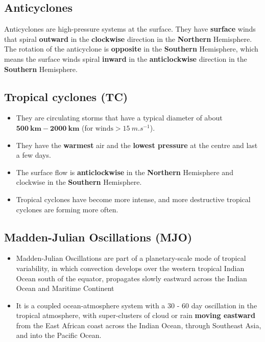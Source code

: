\documentclass[11pt]{article}
\begin{document}
\subsection{Anticyclones}
\label{sec:org1906adb}
Anticyclones are high-pressure systems at the surface. They have \textbf{surface} winds that spiral \textbf{outward} in the \textbf{clockwise} direction in the \textbf{Northern} Hemisphere. The rotation of the anticyclone is \textbf{opposite} in the \textbf{Southern} Hemisphere, which means the surface winds spiral \textbf{inward} in the \textbf{anticlockwise} direction in the \textbf{Southern} Hemisphere.

\subsection{Tropical cyclones (TC)}
\label{sec:orga4bb858}
\begin{itemize}
\item They are circulating storms that have a typical diameter of about \(\mathbf{\qty{500}{km} - \qty{2000}{km}}\) (for \(\text{winds} > \qty{15}{m.s^{-1}}\)).
\item They have the \textbf{warmest} air and the \textbf{lowest pressure} at the centre and last a few days.
\item The surface flow is \textbf{anticlockwise} in the \textbf{Northern} Hemisphere and clockwise in the \textbf{Southern} Hemisphere.
\item Tropical cyclones have become more intense, and more destructive tropical cyclones are forming more often.
\end{itemize}

\newpage

\subsection{Madden-Julian Oscillations (MJO)}
\label{sec:org12de049}
\begin{itemize}
\item Madden-Julian Oscillations are part of a planetary-scale mode of tropical variability, in which convection develops over the western tropical Indian Ocean south of the equator, propagates slowly eastward across the Indian Ocean and Maritime Continent
\item It is a coupled ocean-atmosphere system with a 30 - 60 day oscillation in the tropical atmosphere, with super-clusters of cloud or rain \textbf{moving eastward} from the East African coast across the Indian Ocean, through Southeast Asia, and into the Pacific Ocean.
\end{itemize}
\end{document}
